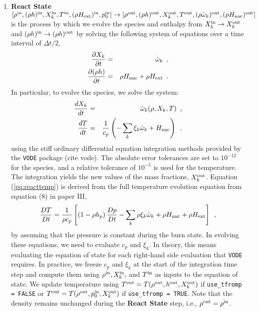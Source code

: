 \begin{enumerate}
\item {\bf React State}$[\rho^{\mathrm{in}},(\rho h)^{\mathrm{in}},X_k^{\mathrm{in}},T^{\mathrm{in}}, (\rho{H_{\rm ext}})^{\mathrm{in}}, 
p_0^{\mathrm{in}}]\rightarrow [\rho^{\mathrm{out}}, (\rho h)^{\mathrm{out}}, X_k^{\mathrm{out}}, T^{\mathrm{out}}, 
(\rho \dot{\omega}_k)^{\mathrm{out}}, (\rho{H_{\rm nuc}})^{\mathrm{out}}]$
is the process by which we evolve the species and enthalpy from 
$X_k^{\mathrm{in}} \rightarrow X_k^{\mathrm{out}}$ 
and $(\rho h)^{\mathrm{in}} \rightarrow (\rho h)^{\mathrm{out}}$ by solving the following 
system of equations over a time interval of  $\Delta t/2$,
\begin{eqnarray}
\frac{\partial X_k}{\partial t} &=& \dot{\omega}_k\enskip,\\
\frac{\partial (\rho h)}{\partial t} &=& \rho {H_{\rm nuc}} + \rho {H_{\rm ext}}\enskip .
\end{eqnarray}
  In particular, to evolve the species, we solve the system:
\begin{eqnarray}
\frac{dX_k}{dt} &=& \dot{\omega}_k(\rho,X_k,T)\enskip, \\
\frac{dT}{dt} &=&\frac{1}{c_p} \left ( -\sum_k \xi_k  \dot{\omega}_k  + {H_{\rm nuc}} \right )
\enskip. \label{eq:reacttemp}
\end{eqnarray}
using the stiff ordinary differential equation integration methods
provided by the {\tt VODE} package (cite vode).  The absolute error
tolerances are set to $10^{-12}$ for the species, and a relative
tolerance of $10^{-5}$ is used for the temperature.  The integration
yields the new values of the mass fractions, $X_k^{\mathrm{out}}$.  Equation
(\ref{eq:reacttemp}) is derived from the full temperature evolution equation
from equation (8) in paper III,
\begin{equation}
\label{eq:tempenthalpy}
\frac{DT}{Dt} = \frac{1}{\rho c_p} \left[ \left(1 - \rho h_p\right) \frac{D p}{D t}
 - \sum_k \rho \xi_k {\dot{\omega}}_k 
 + \rho {H_{\rm nuc}} + \rho {H_{\rm ext}} \right] \enskip , 
\end{equation}
by assuming that the pressure is constant during the burn state.  In
evolving these equations, we need to evaluate $c_p$ and $\xi_k$.  In
theory, this means evaluating the equation of state for each
right-hand side evaluation that {\tt VODE} requires.  In practice, we
freeze $c_p$ and $\xi_k$ at the start of the integration time step and
compute them using $\rho^{\mathrm{in}}, X_k^{\mathrm{in}},$ and $T^{\mathrm{in}}$ as inputs
to the equation of state.  We update temperature using
$T^{\mathrm{out}} = T(\rho^{\mathrm{out}},h^{\mathrm{out}},X_k^{\mathrm{out}})$ if {\tt use\_tfromp = FALSE} or 
$T^{\mathrm{out}} = T(\rho^{\mathrm{out}},p_0^{\mathrm{in}},X_k^{\mathrm{out}})$  if {\tt use\_tfromp = TRUE}.  
Note that the density remains unchanged
during the {\bf React State} step, i.e., $\rho^{\mathrm{out}} = \rho^{\mathrm{in}}$.


\end{enumerate}
